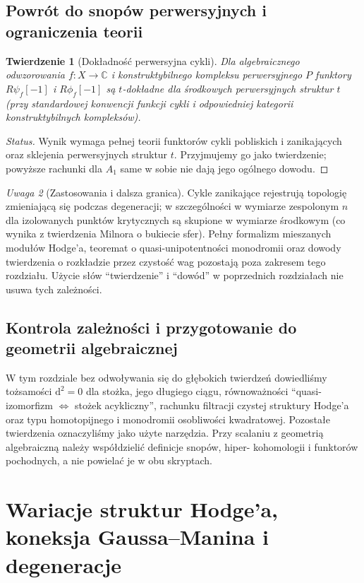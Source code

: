 \documentclass[11pt,a4paper,oneside]{report}
\newcommand{\C}{\mathbb{C}}
\newcommand{\dd}{\mathrm d}
\theoremstyle{plain}
\newtheorem{twierdzenie}{Twierdzenie}[section]
\theoremstyle{definition}
\theoremstyle{remark}
\newtheorem{uwaga}[twierdzenie]{Uwaga}
\begin{document}
\section{Powrót do snopów perwersyjnych i ograniczenia teorii}
\begin{twierdzenie}[Dokładność perwersyjna cykli]
Dla algebraicznego odwzorowania $f:X\to\C$ i
konstruktybilnego kompleksu perwersyjnego $P$
funktory $R\psi_f[-1]$ i $R\phi_f[-1]$
są $t$-dokładne dla środkowych perwersyjnych
struktur $t$ (przy standardowej konwencji
funkcji cykli i odpowiedniej kategorii
konstruktybilnych kompleksów).
\end{twierdzenie}
\begin{proof}[Status]
Wynik wymaga pełnej teorii funktorów cykli
pobliskich i zanikających oraz sklejenia
perwersyjnych struktur $t$. Przyjmujemy go
jako twierdzenie; powyższe rachunki dla
$A_1$ same w sobie nie dają jego ogólnego dowodu.
\end{proof}
\begin{uwaga}[Zastosowania i dalsza granica]
Cykle zanikające rejestrują topologię zmieniającą
się podczas degeneracji; w szczególności w
wymiarze zespolonym $n$ dla izolowanych punktów
krytycznych są skupione w wymiarze środkowym
(co wynika z twierdzenia Milnora o bukiecie sfer).
Pełny formalizm mieszanych modułów Hodge'a,
teoremat o quasi-unipotentności monodromii
oraz dowody twierdzenia o rozkładzie przez
czystość wag pozostają poza zakresem tego rozdziału.
Użycie słów ``twierdzenie'' i ``dowód'' w
poprzednich rozdziałach nie usuwa tych zależności.
\end{uwaga}

\section{Kontrola zależności i przygotowanie do geometrii algebraicznej}
W tym rozdziale bez odwoływania się do głębokich twierdzeń
dowiedliśmy tożsamości
$\dd^2=0$ dla stożka, jego długiego ciągu,
równoważności ``quasi-izomorfizm $\Leftrightarrow$
stożek acykliczny'', rachunku filtracji
czystej struktury Hodge'a oraz typu homotopijnego
i monodromii osobliwości kwadratowej. Pozostałe
twierdzenia oznaczyliśmy jako użyte narzędzia.
Przy scalaniu z geometrią algebraiczną
należy współdzielić definicje snopów, hiper-
kohomologii i funktorów pochodnych, a nie
powielać je w obu skryptach.

\chapter{Wariacje struktur Hodge'a, koneksja Gaussa--Manina i degeneracje}
\label{ch:xv-vhs-degeneracje}
\end{document}
